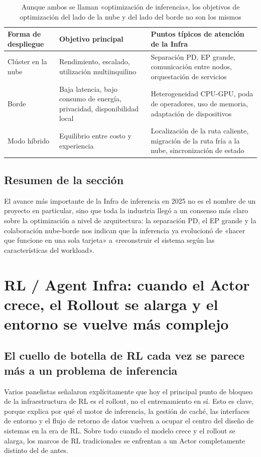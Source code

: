 \documentclass[a4paper]{article}
\begin{document}
\begin{table}[H]
\centering
\begin{tabular}{p{2.8cm}p{4.0cm}p{4.5cm}}
\toprule
\textbf{Forma de despliegue} & \textbf{Objetivo principal} & \textbf{Puntos típicos de atención de la Infra} \\
\midrule
Clúster en la nube & Rendimiento, escalado, utilización multiinquilino & Separación PD, EP grande, comunicación entre nodos, orquestación de servicios \\
Borde & Baja latencia, bajo consumo de energía, privacidad, disponibilidad local & Heterogeneidad CPU-GPU, poda de operadores, uso de memoria, adaptación de dispositivos \\
Modo híbrido & Equilibrio entre costo y experiencia & Localización de la ruta caliente, migración de la ruta fría a la nube, sincronización de estado \\
\bottomrule
\end{tabular}
\caption{Aunque ambos se llaman «optimización de inferencia», los objetivos de optimización del lado de la nube y del lado del borde no son los mismos}
\end{table}

\subsection{Resumen de la sección}
El avance más importante de la Infra de inferencia en 2025 no es el nombre de un proyecto en particular, sino que toda la industria llegó a un consenso más claro sobre la optimización a nivel de arquitectura: la separación PD, el EP grande y la colaboración nube-borde nos indican que la inferencia ya evolucionó de «hacer que funcione en una sola tarjeta» a «reconstruir el sistema según las características del workload».
\section{RL / Agent Infra: cuando el Actor crece, el Rollout se alarga y el entorno se vuelve más complejo}

\subsection{El cuello de botella de RL cada vez se parece más a un problema de inferencia}
Varios panelistas señalaron explícitamente que hoy el principal punto de bloqueo de la infraestructura de RL es el rollout, no el entrenamiento en sí. Esto es clave, porque explica por qué el motor de inferencia, la gestión de caché, las interfaces de entorno y el flujo de retorno de datos vuelven a ocupar el centro del diseño de sistemas en la era de RL. Sobre todo cuando el modelo crece y el rollout se alarga, los marcos de RL tradicionales se enfrentan a un Actor completamente distinto del de antes.
\end{document}
